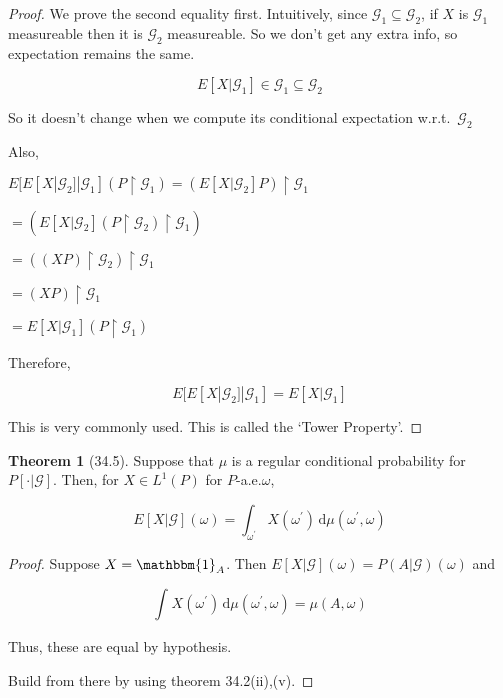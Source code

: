 \documentclass{article}
\theoremstyle{definition}
\newtheorem{theorem}{Theorem}
\begin{document}
\begin{proof}
    We prove the second equality first. Intuitively, since \(\mathscr{G}_1 \subseteq \mathscr{G} _2\), if \(X\) is \(\mathscr{G}_1\) measureable then it is \(\mathscr{G}_2\) measureable. So we don't get any extra info, so expectation remains the same.

    \[
        E[X|\mathscr{G}_1]\in \mathscr{G}_1 \subseteq \mathscr{G}_2
    \]

    So it doesn't change when we compute its conditional expectation w.r.t.\ \(\mathscr{G}_2\) 

    Also,

    \(E[E[X|\mathscr{G}_2]|\mathscr{G}_1](P\upharpoonright \mathscr{G}_1) = (E[X|\mathscr{G}_2]P)\upharpoonright \mathscr{G}_1\)
    
    \(= (E[X|\mathscr{G}_2](P\upharpoonright \mathscr{G}_2)\upharpoonright \mathscr{G}_1)\) 

    \(= ((XP)\upharpoonright \mathscr{G}_2)\upharpoonright \mathscr{G}_1\) 

    \(= (XP)\upharpoonright \mathscr{G}_1\) 
    
    \(= E[X|\mathscr{G}_1](P\upharpoonright \mathscr{G}_1)\) 

    Therefore,

    \[
        E[E[X|\mathscr{G}_2]|\mathscr{G}_1] = E[X|\mathscr{G}_1]
    \]

    This is very commonly used. This is called the `Tower Property'.

\end{proof}

\begin{theorem}
    [34.5]

    Suppose that \(\mu\) is a regular conditional probability for \(P[\cdot | \mathscr{G}]\). Then, for \(X\in L^1(P)\) for \(P\)-a.e.\(\omega\),

    \[
        E[X|\mathscr{G}](\omega) = \int_{\omega^{\prime} }^{} X(\omega^{\prime}) \,\mathrm{d}\mu(\omega^{\prime} , \omega) 
    \]

\end{theorem}

\begin{proof}
    Suppose \(X = \mathbbm{1}_{A}\). Then \(E[X|\mathscr{G}](\omega) = P(A|\mathscr{G})(\omega)\) and

    \[
        \int_{}^{} X(\omega ^{\prime}) \,\mathrm{d}\mu (\omega ^{\prime} ,\omega) = \mu (A,\omega)
    \]

    Thus, these are equal by hypothesis.

    Build from there by using theorem 34.2(ii),(v).

\end{proof}
\end{document}
